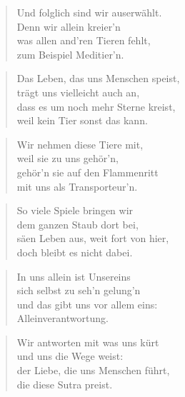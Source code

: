 \documentclass[10pt,a4paper]{article}
\begin{document}
\begin{paracol}{2}
\begin{verse}
Und folglich sind wir auserwählt. \\
Denn wir allein kreier’n \\
was allen and’ren Tieren fehlt, \\
zum Beispiel Meditier’n. \\
\end{verse}

\begin{verse}
Das Leben, das uns Menschen speist, \\
trägt uns vielleicht auch an, \\
dass es um noch mehr Sterne kreist, \\
weil kein Tier sonst das kann. \\
\end{verse}

\begin{verse}
Wir nehmen diese Tiere mit, \\
weil sie zu uns gehör’n, \\
gehör’n sie auf den Flammenritt \\
mit uns als Transporteur’n. \\
\end{verse}

\begin{verse}
So viele Spiele bringen wir \\
dem ganzen Staub dort bei, \\
säen Leben aus, weit fort von hier, \\
doch bleibt es nicht dabei. \\
\end{verse}

\begin{verse}
In uns allein ist Unsereins \\
sich selbst zu seh’n gelung’n \\
und das gibt uns vor allem eins: \\
Alleinverantwortung. \\
\end{verse}

\begin{verse}
Wir antworten mit was uns kürt \\
und uns die Wege weist: \\
der Liebe, die uns Menschen führt, \\
die diese Sutra preist. \\
\end{verse}


\end{paracol}
\end{document}
